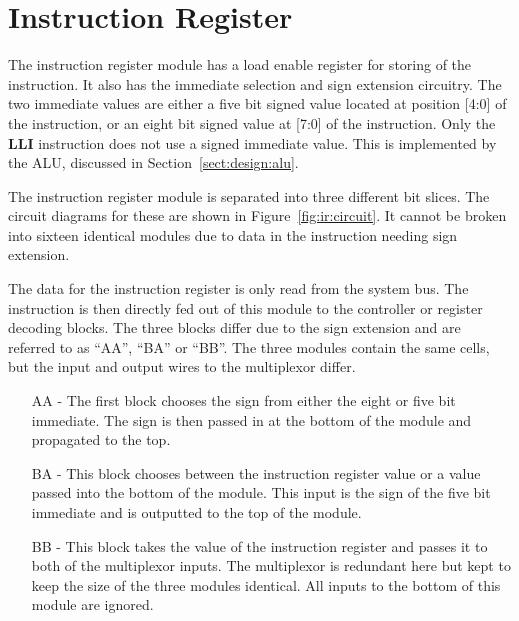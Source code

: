 
\section{Instruction Register}


The instruction register module has a load enable register for storing of the instruction.
It also has the immediate selection and sign extension circuitry.
The two immediate values are either a five bit signed value located at position [4:0] of the instruction, or an eight bit signed value at [7:0] of the instruction.
Only the \textbf{LLI} instruction does not use a signed immediate value. 
This is implemented by the ALU, discussed in Section~\ref{sect:design:alu}.


The instruction register module is separated into three different bit slices.
The circuit diagrams for these are shown in Figure~\ref{fig:ir:circuit}.
It cannot be broken into sixteen identical modules due to data in the instruction needing sign extension. 

The data for the instruction register is only read from the system bus. 
The instruction is then directly fed out of this module to the controller or register decoding blocks.
The three blocks differ due to the sign extension and are referred to as ``AA'', ``BA'' or ``BB''.
The three modules contain the same cells, but the input and output wires to the multiplexor differ. 
\begin{enumerate}
\item[AA] - The first block chooses the sign from either the eight or five bit immediate. The sign is then passed in at the bottom of the module and propagated to the top.
\item[BA] - This block chooses between the instruction register value or a value passed into the bottom of the module. This input is the sign of the five bit immediate and is outputted to the top of the module.
\item[BB] - This block takes the value of the instruction register and passes it to both of the multiplexor inputs. The multiplexor is redundant here but kept to keep the size of the three modules identical. All inputs to the bottom of this module are ignored.
\end{enumerate}

